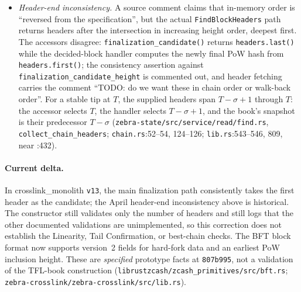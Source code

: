 \documentclass[11pt,a4paper]{article}
\theoremstyle{definition}
\begin{document}
\begin{itemize}
  previous fat pointer hashes to the current tip's, and that the node
  knows the PoW block referenced by \texttt{headers.first()}. The
  Linearity rule, Tail Confirmation validation, and the Confirmed
  best-chain criterion are \emph{not} enforced on this path; the
  decided-block handler additionally verifies fat-pointer signatures,
  with a TODO to check the public keys against the roster
  (\texttt{zebra-crosslink/src/chain.rs}:61--151, 99--104;
  \texttt{zebra-crosslink/src/lib.rs}:522--541, 790--822).
\item \emph{Header-end inconsistency.} A source comment claims that
  in-memory order is ``reversed from the specification'', but the actual
  \texttt{FindBlockHeaders} path returns headers after the intersection
  in increasing height order, deepest first. The accessors disagree:
  \texttt{finalization\_\allowbreak candidate()} returns
  \texttt{headers.last()}
  while the decided-block handler computes the newly final PoW hash from
  \texttt{headers.first()}; the consistency assertion against
  \texttt{finalization\_candidate\_height} is commented out, and header
  fetching carries the comment ``TODO: do we want these in chain order or
  walk-back order''. For a stable tip at $T$, the supplied headers span
  $T-\sigma+1$ through $T$: the accessor selects $T$, the handler selects
  $T-\sigma+1$, and the book's snapshot is their predecessor
  $T-\sigma$ (\texttt{zebra-state/src/service/read/find.rs},
  \texttt{collect\_chain\_headers}; \texttt{chain.rs}:52--54, 124--126;
  \texttt{lib.rs}:543--546, 809, near :432).
\end{itemize}

\paragraph{Current delta.} In crosslink\_monolith \texttt{v13}, the main
finalization path consistently takes the first header as the candidate;
the April header-end inconsistency above is historical. The constructor
still validates only the number of headers and still logs that the other
documented validations are unimplemented, so this correction does not
establish the Linearity, Tail Confirmation, or best-chain checks. The BFT
block format now supports version~2 fields for hard-fork data and an
earliest PoW inclusion height. These are \emph{specified} prototype facts
at \texttt{807b995}, not a validation of the TFL-book construction
(\texttt{librustzcash/zcash\_primitives/src/bft.rs};
\texttt{zebra-crosslink/zebra-crosslink/src/lib.rs}).
\end{document}
